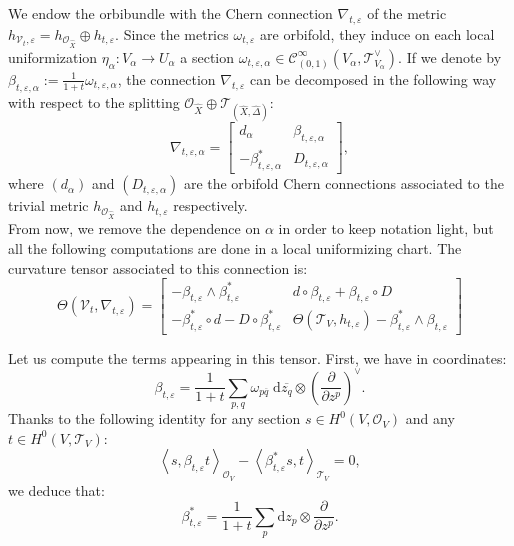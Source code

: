 \documentclass[12pt,a4paper]{amsart}
\theoremstyle{plain}
\theoremstyle{definition}
\begin{document}
We endow the orbibundle with the Chern connection $\nabla_{t, \varepsilon}$ of the metric $h_{\mathcal{V}_t, \varepsilon} = h_{\mathcal{O}_{\widehat{X}}} \oplus h_{t, \varepsilon}$. 
Since the metrics $\omega_{t, \varepsilon}$ are orbifold, they induce on each local uniformization $\eta_\alpha : V_\alpha \to U_\alpha$ a section $\omega_{t, \varepsilon, \alpha} \in \mathcal{C}^\infty_{(0,1)}(V_\alpha, \mathcal{T}_{V_\alpha}^\vee)$. If we denote by $\beta_{t, \varepsilon, \alpha} := \frac{1}{1+t}\omega_{t, \varepsilon, \alpha}$, the connection $\nabla_{t, \varepsilon}$ can be decomposed in the following way with respect to the splitting $\mathcal{O}_{\widehat{X}} \oplus \mathcal{T}_{(\widehat{X}, \widehat{\Delta})}$:
$$
\nabla_{t, \varepsilon, \alpha} =
\begin{bmatrix}
    d_\alpha & \beta_{t, \varepsilon,\alpha} \\
    - \beta_{t, \varepsilon,\alpha}^* & D_{t, \varepsilon, \alpha}
\end{bmatrix},
$$
where $(d_\alpha)$ and $(D_{t, \varepsilon, \alpha})$ are the orbifold Chern connections associated to the trivial metric $h_{\mathcal{O}_{\widehat{X}}}$ and $h_{t, \varepsilon}$ respectively.\\

From now, we remove the dependence on $\alpha$ in order to keep notation light, but all the following computations are done in a local uniformizing chart. The curvature tensor associated to this connection is:
\begin{equation}
    \Theta(\mathcal{V}_t, \nabla_{t, \varepsilon}) =
\begin{bmatrix}
    - \beta_{t, \varepsilon } \wedge \beta_{t, \varepsilon }^* & d  \circ \beta_{t, \varepsilon } + \beta_{t, \varepsilon } \circ D  \\
    - \beta_{t, \varepsilon }^* \circ d  - D  \circ \beta_{t, \varepsilon }^* & \Theta(\mathcal{T}_{V }, h_{t, \varepsilon}) - \beta_{t, \varepsilon }^* \wedge \beta_{t, \varepsilon }
\end{bmatrix}
\end{equation}



Let us compute the terms appearing in this tensor.
First, we have in coordinates:
\begin{equation}\label{Beta local}
    \beta_{t, \varepsilon} = \frac{1}{1+t} \sum_{p,q} \omega_{p\overline{q}}\; \mathrm{d}\overline{z_q} \otimes \left( \frac{\partial}{\partial z^p} \right)^\vee.
\end{equation}
Thanks to the following identity for any section $s \in H^0(V, \mathcal{O}_V)$ and any $t \in H^0(V, \mathcal{T}_V)$:
$$
\left\langle s,  \beta_{t, \varepsilon} t \right\rangle_{\mathcal{O}_V} - \left\langle \beta_{t, \varepsilon}^* s ,  t \right\rangle_{\mathcal{T}_V} = 0,
$$
we deduce that:
\begin{equation}\label{Transconjugue beta local}
    \beta_{t, \varepsilon}^* = \frac{1}{1+t} \sum_{p} \mathrm{d}z_p \otimes \frac{\partial}{\partial z^p}.
\end{equation}
\end{document}
